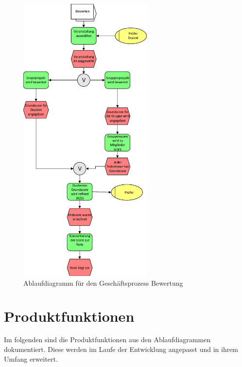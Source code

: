 	\begin{figure}[th!]
	\centering
	\includegraphics[width=0.6\textwidth]{./img/ablauf_2}
	\caption{Ablaufdiagramm für den Geschäftsprozess Bewertung}
	\label{fig:process2}
	\end{figure}

	\section{Produktfunktionen}
	Im folgenden sind die Produktfunktionen aus den Ablaufdiagrammen dokumentiert. Diese werden im Laufe der Entwicklung angepasst und in ihrem Umfang erweitert.
	
